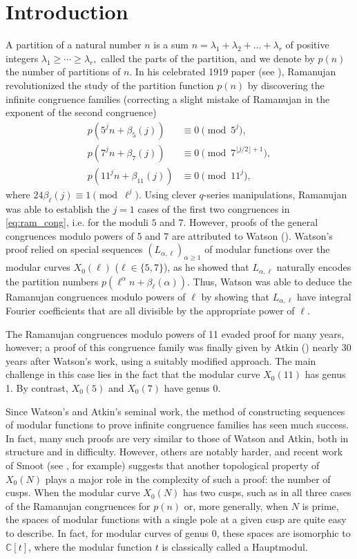 \documentclass[12pt, reqno]{amsart}
\theoremstyle{definition}
\theoremstyle{remark}
\begin{document}
\section{Introduction}\label{sec:intro}
A partition of a natural number $n$ is a sum $n = \lambda_1 + \lambda_2 + \dots +\lambda_r$ of positive integers $\lambda_1 \geq \cdots \geq \lambda_r,$ called the parts of the partition, and we denote by $p(n)$ the number of partitions of $n$. In his celebrated 1919 paper (see \cite{BO}), Ramanujan revolutionized the study of the partition function $p(n)$ by discovering the infinite congruence families (correcting a slight mistake of Ramanujan in the exponent of the second congruence)
\begin{equation}
\begin{split}
p(5^jn+\beta_5(j)) &\equiv 0 \pmod{5^j}, \\
p(7^jn+\beta_7(j)) &\equiv 0 \pmod{7^{\lfloor j/2\rfloor+1}}  \label{eq:ram_cong}, \\ 
p(11^jn+\beta_{11}(j)) &\equiv 0 \pmod{11^j},
\end{split}
\end{equation}
where $24\beta_\ell(j) \equiv 1 \pmod{\ell^j}.$
Using clever $q$-series manipulations, Ramanujan was able to establish the $j=1$ cases of the first two congruences in \eqref{eq:ram_cong}, i.e. for the moduli $5$ and $7$. However, proofs of the general congruences modulo powers of 5 and 7 are attributed to Watson (\cite{Watson}). Watson's proof relied on special sequences $(L_{\alpha,\ell})_{\alpha \geq 1}$ of modular functions over the modular curves $X_0(\ell)$ ($\ell \in \{5,7\}$), as he showed that $L_{\alpha,\ell}$ naturally encodes the partition numbers $p\left(\ell^\alpha n + \beta_\ell(\alpha)\right).$ Thus, Watson was able to deduce the Ramanujan congruences modulo powers of $\ell$ by showing that $L_{\alpha,\ell}$ have integral Fourier coefficients that are all divisible by the appropriate power of $\ell$.

The Ramanujan congruences modulo powers of 11 evaded proof for many years, however; a proof of this congruence family was finally given by Atkin (\cite{Atkin}) nearly 30 years after Watson's work, using a suitably modified approach. The main challenge in this case lies in the fact that the modular curve $X_0(11)$ has genus 1. By contrast, $X_0(5)$ and $X_0(7)$ have genus 0. 

Since Watson's and Atkin's seminal work, the method of constructing sequences of modular functions to prove infinite congruence families has seen much success. In fact, many such proofs are very similar to those of Watson and Atkin, both in structure and in difficulty. However, others are notably harder, and recent work of Smoot (see \cite{Smoot2elong}, for example) suggests that another topological property of $X_0(N)$ plays a major role in the complexity of such a proof: the number of cusps. When the modular curve $X_0(N)$ has two cusps, such as in all three cases of the Ramanujan congruences for $p(n)$ or, more generally, when $N$ is prime, the spaces of modular functions with a single pole at a given cusp are quite easy to describe. In fact, for modular curves of genus 0, these spaces are isomorphic to $\mathbb{C}[t]$, where the modular function $t$ is classically called a Hauptmodul. 
\end{document}
